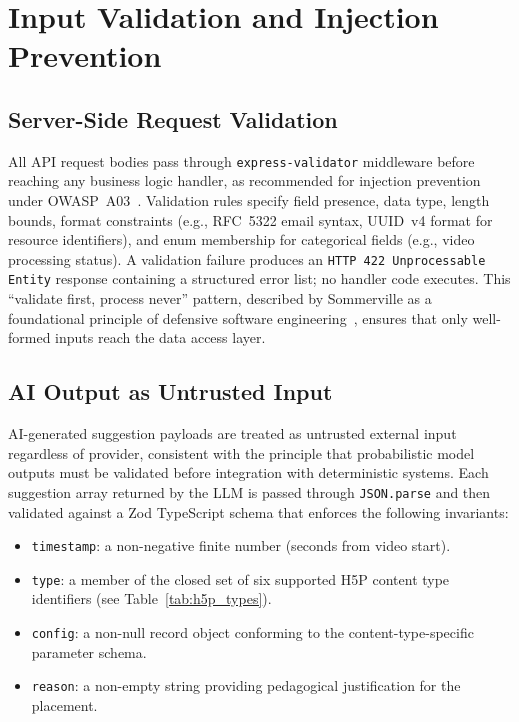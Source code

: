 \section{Input Validation and Injection Prevention}
\label{sec:validation}

\subsection{Server-Side Request Validation}

All API request bodies pass through \texttt{express-validator} middleware
before reaching any business logic handler, as recommended for injection
prevention under OWASP~A03~\cite{owasp2021}. Validation rules specify field
presence, data type, length bounds, format constraints (e.g., RFC~5322 email
syntax, UUID~v4 format for resource identifiers), and enum membership for
categorical fields (e.g., video processing status). A validation failure
produces an \texttt{HTTP~422 Unprocessable Entity} response containing a
structured error list; no handler code executes. This ``validate first,
process never'' pattern, described by Sommerville as a foundational
principle of defensive software engineering~\cite{sommerville2016}, ensures
that only well-formed inputs reach the data access layer.

\subsection{AI Output as Untrusted Input}

AI-generated suggestion payloads are treated as untrusted external input
regardless of provider, consistent with the principle that probabilistic
model outputs must be validated before integration with deterministic
systems. Each suggestion array returned by the LLM is passed through
\texttt{JSON.parse} and then validated against a Zod TypeScript schema that
enforces the following invariants:

\begin{itemize}
  \item \texttt{timestamp}: a non-negative finite number (seconds from
  video start).
  \item \texttt{type}: a member of the closed set of six supported H5P
  content type identifiers (see Table~\ref{tab:h5p_types}).
  \item \texttt{config}: a non-null record object conforming to the
  content-type-specific parameter schema.
  \item \texttt{reason}: a non-empty string providing pedagogical
  justification for the placement.
\end{itemize}

